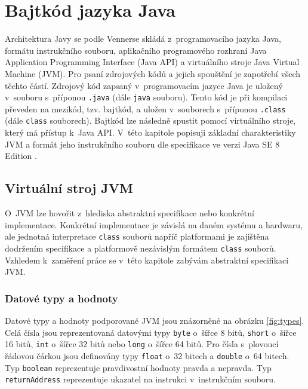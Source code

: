 \chapter{Bajtkód jazyka Java}\label{Bytecode}

Architektura Javy se podle Vennerse \cite{Venners:InsideJVM} skládá z~programovacího jazyka Java, formátu instrukčního souboru, aplikačního programového rozhraní Java Application Programming Interface (Java API) a virtuálního stroje Java Virtual Machine (JVM). Pro psaní zdrojových kódů a jejich spouštění je zapotřebí všech těchto částí.
Zdrojový kód zapsaný v~programovacím jazyce Java je uložený v~souboru s~příponou \texttt{.java} (dále \texttt{java} souboru). Tento kód je při kompilaci převeden na mezikód, tzv. bajtkód, a uložen v~souborech s~příponou \texttt{.class} (dále \texttt{class} souborech). Bajtkód lze následně spustit pomocí virtuálního stroje, který má přístup k~Java API. 
V~této kapitole popisuji základní charakteristiky JVM a formát jeho instrukčního souboru dle specifikace ve verzi Java SE 8 Edition \cite{Lindholm:JVM}.

\section{Virtuální stroj JVM}\label{Bytecode:JVM}

O~JVM lze  hovořit z~hlediska abstraktní specifikace nebo konkrétní implementace. Konkrétní implementace je závislá na daném systému a hardwaru, ale jednotná interpretace \texttt{class} souborů napříč platformami je zajištěna dodržením specifikace a platformově nezávislým formátem \texttt{class} souborů. Vzhledem k~zaměření práce se v~této kapitole zabývám abstraktní specifikací JVM.

\subsection{Datové typy a hodnoty}

Datové typy a hodnoty podporované JVM jsou znázorněné na obrázku \ref{fig:types}. Celá čísla jsou reprezentovaná datovými typy \texttt{byte} o~šířce 8 bitů, \texttt{short} o~šířce 16 bitů, \texttt{int} o~šířce 32 bitů nebo \texttt{long} o~šířce 64 bitů. Pro čísla s~plovoucí řádovou čárkou jsou definovány typy \texttt{float} o~32 bitech a \texttt{double} o~64 bitech. Typ \texttt{boolean} reprezentuje pravdivostní hodnoty pravda a nepravda. Typ \texttt{returnAddress} reprezentuje ukazatel na instrukci v~instrukčním souboru.

